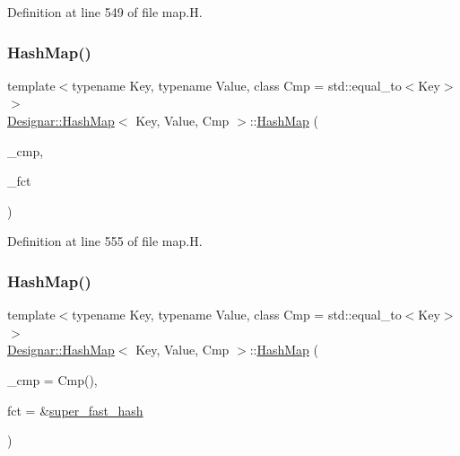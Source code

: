 Definition at line 549 of file map.\+H.

\mbox{\label{class_designar_1_1_hash_map_ad1b22ee9f50a5be7febcf622ae8cb31a}} 
\subsubsection{\texorpdfstring{Hash\+Map()}{HashMap()}\hspace{0.1cm}{\footnotesize\ttfamily [3/7]}}
{\footnotesize\ttfamily template$<$typename Key, typename Value, class Cmp = std\+::equal\+\_\+to$<$\+Key$>$$>$ \\
\hyperlink{class_designar_1_1_hash_map}{Designar\+::\+Hash\+Map}$<$ Key, Value, Cmp $>$\+::\hyperlink{class_designar_1_1_hash_map}{Hash\+Map} (\begin{DoxyParamCaption}\item[{Cmp \&}]{\+\_\+cmp,  }\item[{Hash\+Fct\+Ptr}]{\+\_\+fct }\end{DoxyParamCaption})\hspace{0.3cm}{\ttfamily [inline]}}



Definition at line 555 of file map.\+H.

\mbox{\label{class_designar_1_1_hash_map_ad310e763bce2806e390fde121efe92c6}} 
\subsubsection{\texorpdfstring{Hash\+Map()}{HashMap()}\hspace{0.1cm}{\footnotesize\ttfamily [4/7]}}
{\footnotesize\ttfamily template$<$typename Key, typename Value, class Cmp = std\+::equal\+\_\+to$<$\+Key$>$$>$ \\
\hyperlink{class_designar_1_1_hash_map}{Designar\+::\+Hash\+Map}$<$ Key, Value, Cmp $>$\+::\hyperlink{class_designar_1_1_hash_map}{Hash\+Map} (\begin{DoxyParamCaption}\item[{Cmp \&\&}]{\+\_\+cmp = {\ttfamily Cmp()},  }\item[{Hash\+Fct\+Ptr}]{fct = {\ttfamily \&\hyperlink{namespace_designar_afd5712d16b3ae1c1c7d59f1004cd96fd}{super\+\_\+fast\+\_\+hash}} }\end{DoxyParamCaption})\hspace{0.3cm}{\ttfamily [inline]}}



